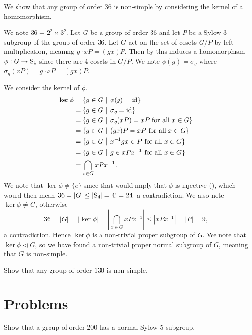 \begin{example}\label{example-using-kernel-to-show-non-simple}
    We show that any group of order 36 is non-simple by considering the kernel of a homomorphism.

    We note $36 = 2^2 \times 3^2$. Let $G$ be a group of order 36 and let $P$ be a Sylow 3-subgroup of the group of order 36. Let $G$ act on the set of cosets $G/P$ by left multiplication, meaning $g \cdot xP = (gx)P$. Then by  this induces a homomorphism $\phi: G \to \mathrm{S}_{4}$ since there are 4 cosets in $G/P$. We note $\phi(g) = \sigma_g$ where $\sigma_g(xP) = g\cdot xP = (gx)P$.

    We consider the kernel of $\phi$.
    \begin{align*}
        \ker\phi &= \{g \in G \vert \phi(g) = \id\}\\
        &= \{g \in G \vert \sigma_g = \id\}\\
        &= \{g \in G \vert \sigma_g(xP) = xP \text{ for all } x \in G\}\\
        &= \{g \in G \vert (gx)P = xP \text{ for all } x \in G\}\\
        &= \{g \in G \vert x^{-1}gx \in P \text{ for all } x \in G\}\\
        &= \{g \in G \vert g \in xPx^{-1} \text{ for all } x \in G\}\\
        &= \bigcap_{x \in G} xPx^{-1}.
    \end{align*}
    We note that $\ker\phi \neq \{e\}$ since that would imply that $\phi$ is injective (), which would then mean $36 = |G| \leq |\mathrm{S}_{4}| = 4! = 24$, a contradiction. We also note $\ker\phi \neq G$, otherwise
    \[
        36 = |G| = |\ker\phi| = \left|\bigcap_{x \in G} xPx^{-1}\right| \leq |xPx^{-1}| = |P| = 9,
    \]
    a contradiction. Hence $\ker\phi$ is a non-trivial proper subgroup of $G$. We note that $\ker\phi \lhd G$, so we have found a non-trivial proper normal subgroup of $G$, meaning that $G$ is non-simple.
\end{example}

\begin{exercise}
    Show that any group of order $130$ is non-simple.
\end{exercise}

\newpage

\section{Problems}
\begin{problem}
    Show that a group of order 200 has a normal Sylow 5-subgroup.
\end{problem}

